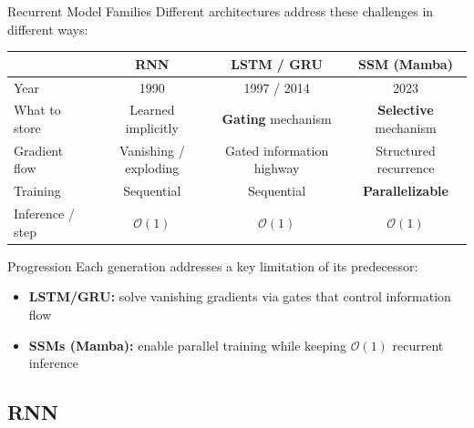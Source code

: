 \begin{frame}{Recurrent Model Families}
  Different architectures address these challenges in different ways:

  \vspace{0.5em}
  \begin{center}
  \renewcommand{\arraystretch}{1.3}
  \small
  \begin{tabular}{l c c c}
    \toprule
    & \textbf{RNN} & \textbf{LSTM / GRU} & \textbf{SSM (Mamba)} \\
    \midrule
    Year          & 1990 & 1997 / 2014 & 2023 \\
    What to store & Learned implicitly & \textbf{Gating} mechanism & \textbf{Selective} mechanism \\
    Gradient flow & Vanishing / exploding & Gated information highway & Structured recurrence \\
    Training      & Sequential & Sequential & \textbf{Parallelizable} \\
    Inference / step & $\mathcal{O}(1)$ & $\mathcal{O}(1)$ & $\mathcal{O}(1)$ \\
    \bottomrule
  \end{tabular}
  \end{center}

  \vspace{0.5em}
  \begin{block}{Progression}
    Each generation addresses a key limitation of its predecessor:
    \begin{itemize}
      \item \textbf{LSTM/GRU:} solve vanishing gradients via gates that control information flow
      \item \textbf{SSMs (Mamba):} enable parallel training while keeping $\mathcal{O}(1)$ recurrent inference
    \end{itemize}
  \end{block}
\end{frame}

\subsection{RNN}

